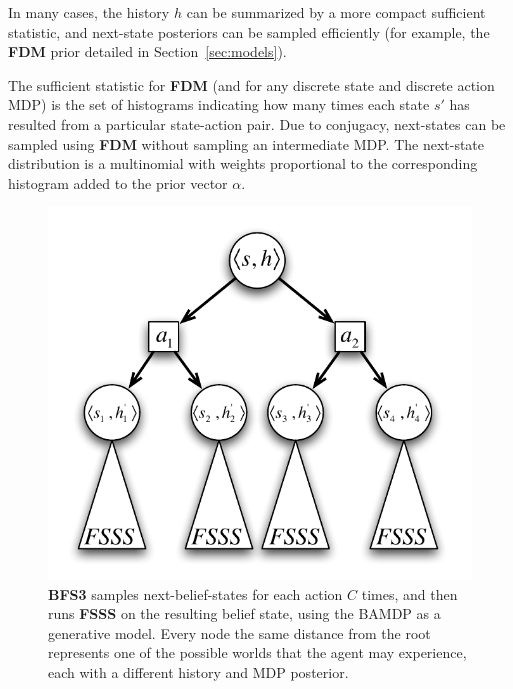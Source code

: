 In many cases, the history $h$ can be summarized by a more compact sufficient statistic, and next-state posteriors can be sampled efficiently (for example, the {\bf FDM} prior detailed in Section~\ref{sec:models}).

The sufficient statistic for {\bf FDM} (and for any discrete state and discrete action MDP) is the set of histograms indicating how many times each state $s'$ has resulted from a particular state-action pair. Due to conjugacy, next-states can be sampled using {\bf FDM} without sampling an intermediate MDP. The next-state distribution is a multinomial with weights proportional to the corresponding histogram added to the prior vector $\alpha$.

\begin{figure}
\vskip 0.2in
\begin{center}
\centerline{\includegraphics[scale=0.5]{bfs3}}
\caption{
{\bf BFS3} samples next-belief-states for each action $C$ times, and then runs {\bf FSSS} on the resulting belief state, using the BAMDP as a generative model. Every node the same distance from the root represents one of the possible worlds that the agent may experience, each with a different history and MDP posterior.
}
\label{fig:bfs3}
\end{center}
\vskip -0.2in
\end{figure} 

